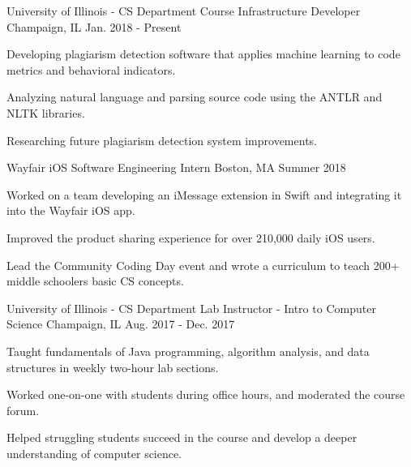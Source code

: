 
\begin{cventries}
\cventry
{University of Illinois - CS Department} %
{Course Infrastructure Developer} %
{Champaign, IL} %
{Jan. 2018 - Present} %
{
	\begin{cvitems} %
		\item {Developing plagiarism detection software that applies machine learning to code metrics and behavioral indicators.}
		\item {Analyzing natural language and parsing source code using the ANTLR and NLTK libraries.}
		\item {Researching future plagiarism detection system improvements.}
	\end{cvitems}
}
\cventry
{Wayfair} %
{iOS Software Engineering Intern} %
{Boston, MA} %
{Summer 2018} %
{
	\begin{cvitems} %
		\item {Worked on a team developing an iMessage extension in Swift and integrating it into the Wayfair iOS app.}
		\item {Improved the product sharing experience for over 210,000 daily iOS users.}
		\item {Lead the Community Coding Day event and wrote a curriculum to teach 200+ middle schoolers basic CS concepts.}
	\end{cvitems}
}
\cventry
{University of Illinois - CS Department} %
{Lab Instructor - Intro to Computer Science} %
{Champaign, IL} %
{Aug. 2017 - Dec. 2017} %
{
	\begin{cvitems} %
		\item {Taught fundamentals of Java programming, algorithm analysis, and data structures in weekly two-hour lab sections.}
		\item {Worked one-on-one with students during office hours, and moderated the course forum.}
		\item {Helped struggling students succeed in the course and develop a deeper understanding of computer science.}
	\end{cvitems}
}
\end{cventries}
